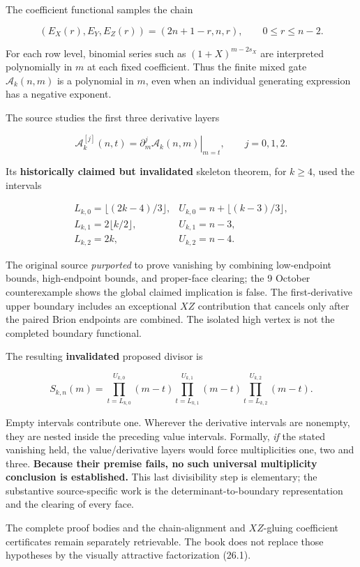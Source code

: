 \documentclass[
  10pt,
  a4paper,
  10pt,
  oneside,
  openany]{book}
\begin{document}
The coefficient functional samples the chain

\[
 (E_X(r),E_Y,E_Z(r))=(2n+1-r,n,r),\qquad0\le r\le n-2.
\]

For each row level, binomial series such as \((1+X)^{m-2s_X}\) are
interpreted polynomially in \(m\) at each fixed coefficient. Thus the
finite mixed gate \(\mathcal A_k(n,m)\) is a polynomial in \(m\), even
when an individual generating expression has a negative exponent.

The source studies the first three derivative layers

\[
 \mathcal A_k^{[j]}(n,t)
 =\left.\partial_m^j\mathcal A_k(n,m)\right|_{m=t},
 \qquad j=0,1,2.
\]

Its \textbf{historically claimed but invalidated} skeleton theorem, for
\(k\ge4\), used the intervals

\[
\begin{array}{lll}
L_{k,0}=\lfloor(2k-4)/3\rfloor,&
U_{k,0}=n+\lfloor(k-3)/3\rfloor,\\
L_{k,1}=2\lfloor k/2\rfloor,&U_{k,1}=n-3,\\
L_{k,2}=2k,&U_{k,2}=n-4.
\end{array}
 \tag{26.3}\label{eq:26.3}
\]

The original source \emph{purported} to prove vanishing by combining
low-endpoint bounds, high-endpoint bounds, and proper-face clearing; the
9 October counterexample shows the global claimed implication is false.
The first-derivative upper boundary includes an exceptional \(XZ\)
contribution that cancels only after the paired Brion endpoints are
combined. The isolated high vertex is not the completed boundary
functional.

The resulting \textbf{invalidated} proposed divisor is

\[
 S_{k,n}(m)=
 \prod_{t=L_{k,0}}^{U_{k,0}}(m-t)
 \prod_{t=L_{k,1}}^{U_{k,1}}(m-t)
 \prod_{t=L_{k,2}}^{U_{k,2}}(m-t).
 \tag{26.4}\label{eq:26.4}
\]

Empty intervals contribute one. Wherever the derivative intervals are
nonempty, they are nested inside the preceding value intervals.
Formally, \emph{if} the stated vanishing held, the value/derivative
layers would force multiplicities one, two and three. \textbf{Because
their premise fails, no such universal multiplicity conclusion is
established.} This last divisibility step is elementary; the substantive
source-specific work is the determinant-to-boundary representation and
the clearing of every face.

The complete proof bodies and the chain-alignment and \(XZ\)-gluing
coefficient certificates remain separately retrievable. The book does
not replace those hypotheses by the visually attractive factorization
(26.1).
\end{document}
